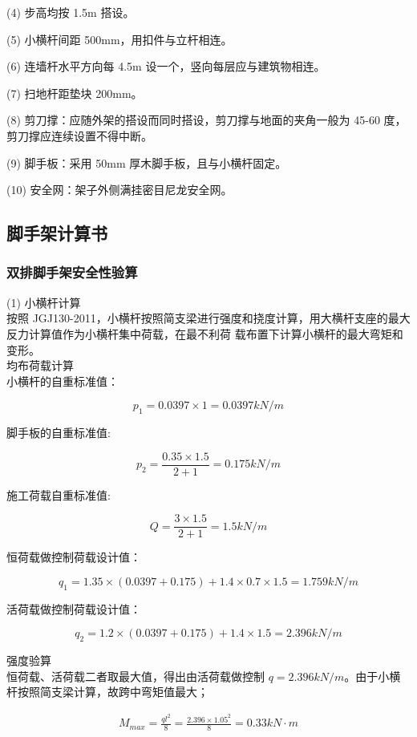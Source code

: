 (4) 步高均按 1.5m 搭设。

(5) 小横杆间距 500mm，用扣件与立杆相连。

(6) 连墙杆水平方向每 4.5m 设一个，竖向每层应与建筑物相连。

(7) 扫地杆距垫块 200mm。

(8) 剪刀撑：应随外架的搭设而同时搭设，剪刀撑与地面的夹角一般为 45-60 度，
剪刀撑应连续设置不得中断。

(9) 脚手板：采用 50mm 厚木脚手板，且与小横杆固定。

(10) 安全网：架子外侧满挂密目尼龙安全网。

\subsection{脚手架计算书}
\subsubsection{双排脚手架安全性验算}

(1) 小横杆计算\\

按照 JGJ130-2011，小横杆按照简支梁进行强度和挠度计算，用大横杆支座的最大反力计算值作为小横杆集中荷载，在最不利荷
载布置下计算小横杆的最大弯矩和变形。\\

 均布荷载计算\\

小横杆的自重标准值：

$$p_1=0.0397 \times 1=0.0397 kN/m$$

脚手板的自重标准值:

$$p_2=\frac{0.35 \times 1.5}{2+1}=0.175 kN/m$$

施工荷载自重标准值:

$$Q=\frac{3 \times 1.5}{2+1}=1.5 kN/m$$

恒荷载做控制荷载设计值：

$$q_1=1.35\times(0.0397+0.175)+1.4\times 0.7\times 1.5=1.759 kN/m$$

活荷载做控制荷载设计值：

$$q_2=1.2\times(0.0397+0.175)+1.4\times 1.5=2.396 kN/m$$

 强度验算\\

恒荷载、活荷载二者取最大值，得出由活荷载做控制 $q=2.396 kN/m$。由于小横杆按照简支梁计算，故跨中弯矩值最大；

\begin{align}
    M_{max}=\frac{ql^2}{8}=\frac{2.396\times 1.05^2}{8}=0.33 kN\cdot m
\end{align}


